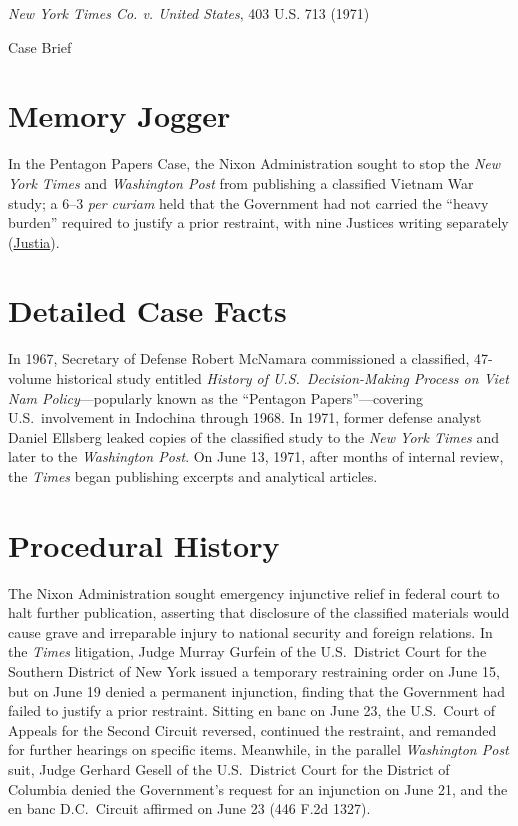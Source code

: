 \documentclass[12pt]{article}
\begin{document}
\begin{center}
{\LARGE \textit{New York Times Co. v. United States}, 403 U.S. 713 (1971)\par}
\vspace{0.8em}
{\large Case Brief\par}
\end{center}
\vspace{1em}

\section{Memory Jogger}
In the Pentagon Papers Case, the Nixon Administration sought to stop the \textit{New York Times} and \textit{Washington Post} from publishing a classified Vietnam War study; a 6--3 \textit{per curiam} held that the Government had not carried the ``heavy burden'' required to justify a prior restraint, with nine Justices writing separately (\href{https://supreme.justia.com/cases/federal/us/403/713/}{Justia}).

\section{Detailed Case Facts}
In 1967, Secretary of Defense Robert McNamara commissioned a classified, 47-volume historical study entitled \textit{History of U.S.\ Decision-Making Process on Viet Nam Policy}---popularly known as the ``Pentagon Papers''---covering U.S.\ involvement in Indochina through 1968. In 1971, former defense analyst Daniel Ellsberg leaked copies of the classified study to the \textit{New York Times} and later to the \textit{Washington Post}. On June 13, 1971, after months of internal review, the \textit{Times} began publishing excerpts and analytical articles.

\section{Procedural History}
The Nixon Administration sought emergency injunctive relief in federal court to halt further publication, asserting that disclosure of the classified materials would cause grave and irreparable injury to national security and foreign relations. In the \textit{Times} litigation, Judge Murray Gurfein of the U.S.\ District Court for the Southern District of New York issued a temporary restraining order on June 15, but on June 19 denied a permanent injunction, finding that the Government had failed to justify a prior restraint. Sitting en banc on June 23, the U.S.\ Court of Appeals for the Second Circuit reversed, continued the restraint, and remanded for further hearings on specific items. Meanwhile, in the parallel \textit{Washington Post} suit, Judge Gerhard Gesell of the U.S.\ District Court for the District of Columbia denied the Government's request for an injunction on June 21, and the en banc D.C.\ Circuit affirmed on June 23 (446 F.2d 1327).
\end{document}
